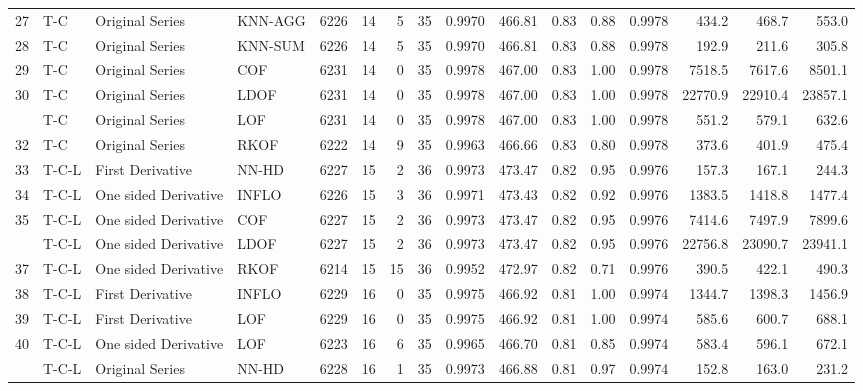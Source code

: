\documentclass[draft]{agujournal2018} %
\begin{document}
\begin{table}[!htbp]
{\begin{tabular}{rlllrrrrrrrrrrrr}
27 & T-C & Original Series & KNN-AGG & 6226 & 14 & 5 & 35 & 0.9970 & 466.81 & 0.83 & 0.88 & 0.9978 & 434.2 & 468.7 & 553.0\\
28 & T-C & Original Series & KNN-SUM & 6226 & 14 & 5 & 35 & 0.9970 & 466.81 & 0.83 & 0.88 & 0.9978 & 192.9 & 211.6 & 305.8\\
29 & T-C & Original Series & COF & 6231 & 14 & 0 & 35 & 0.9978 & 467.00 & 0.83 & 1.00 & 0.9978 & 7518.5 & 7617.6 & 8501.1\\
30 & T-C & Original Series & LDOF & 6231 & 14 & 0 & 35 & 0.9978 & 467.00 & 0.83 & 1.00 & 0.9978 & 22770.9 & 22910.4 & 23857.1\\
\addlinespace
31 & T-C & Original Series & LOF & 6231 & 14 & 0 & 35 & 0.9978 & 467.00 & 0.83 & 1.00 & 0.9978 & 551.2 & 579.1 & 632.6\\
32 & T-C & Original Series & RKOF & 6222 & 14 & 9 & 35 & 0.9963 & 466.66 & 0.83 & 0.80 & 0.9978 & 373.6 & 401.9 & 475.4\\
33 & T-C-L & First Derivative & \color{black} NN-HD \color{black}  & 6227 & 15 & 2 & 36 & 0.9973 & 473.47 & 0.82 & 0.95 & 0.9976 & 157.3 & 167.1 & 244.3\\
34 & T-C-L & One sided Derivative & INFLO & 6226 & 15 & 3 & 36 & 0.9971 & 473.43 & 0.82 & 0.92 & 0.9976 & 1383.5 & 1418.8 & 1477.4\\
35 & T-C-L & One sided Derivative & COF & 6227 & 15 & 2 & 36 & 0.9973 & 473.47 & 0.82 & 0.95 & 0.9976 & 7414.6 & 7497.9 & 7899.6\\
\addlinespace
36 & T-C-L & One sided Derivative & LDOF & 6227 & 15 & 2 & 36 & 0.9973 & 473.47 & 0.82 & 0.95 & 0.9976 & 22756.8 & 23090.7 & 23941.1\\
37 & T-C-L & One sided Derivative & RKOF & 6214 & 15 & 15 & 36 & 0.9952 & 472.97 & 0.82 & 0.71 & 0.9976 & 390.5 & 422.1 & 490.3\\
38 & T-C-L & First Derivative & INFLO & 6229 & 16 & 0 & 35 & 0.9975 & 466.92 & 0.81 & 1.00 & 0.9974 & 1344.7 & 1398.3 & 1456.9\\
39 & T-C-L & First Derivative & LOF & 6229 & 16 & 0 & 35 & 0.9975 & 466.92 & 0.81 & 1.00 & 0.9974 & 585.6 & 600.7 & 688.1\\
40 & T-C-L & One sided Derivative & LOF & 6223 & 16 & 6 & 35 & 0.9965 & 466.70 & 0.81 & 0.85 & 0.9974 & 583.4 & 596.1 & 672.1\\
\addlinespace
41 & T-C-L & Original Series & \color{black} NN-HD \color{black}  & 6228 & 16 & 1 & 35 & 0.9973 & 466.88 & 0.81 & 0.97 & 0.9974 & 152.8 & 163.0 & 231.2\\

\end{tabular}}
\end{table}
\end{document}
